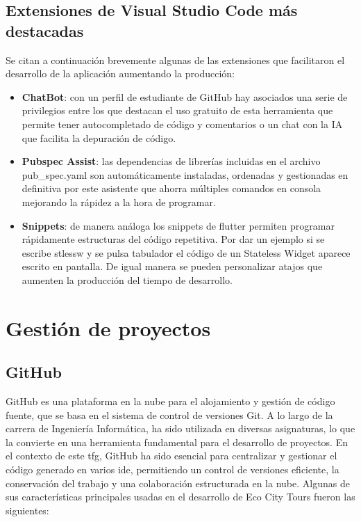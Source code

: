 	\subsection{Extensiones de Visual Studio Code más destacadas}
		Se citan a continuación brevemente algunas de las extensiones que facilitaron el desarrollo de la aplicación aumentando la producción:
		\begin{itemize}
		
		\item \textbf{ChatBot}: con un perfil de estudiante de GitHub hay asociados una serie de privilegios entre los que destacan el uso gratuito de esta herramienta que permite tener autocompletado de código y comentarios o un chat con la IA que facilita la depuración de código. 
		
		\item \textbf{Pubspec Assist}: las dependencias de librerías incluidas en el archivo pub\_spec.yaml son automáticamente instaladas, ordenadas y gestionadas en definitiva por este asistente que ahorra múltiples comandos en consola mejorando la rápidez a la hora de programar.
		
		\item \textbf{Snippets}: de manera análoga los snippets de flutter permiten programar rápidamente estructuras del código repetitiva. Por dar un ejemplo si se escribe stlessw y se pulsa tabulador el código de un Stateless Widget aparece escrito en pantalla. De igual manera se pueden personalizar atajos que aumenten la producción del tiempo de desarrollo.
		
	\end{itemize}
		

\section{Gestión de proyectos}
	\subsection{GitHub}
	GitHub es una plataforma en la nube para el alojamiento y gestión de código fuente, que se basa en el sistema de control de versiones Git. A lo largo de la carrera de Ingeniería Informática, ha sido utilizada en diversas asignaturas, lo que la convierte en una herramienta fundamental para el desarrollo de proyectos. En el contexto de este \acrshort{tfg}, GitHub ha sido esencial para centralizar y gestionar el código generado en varios \acrshort{ide}, permitiendo un control de versiones eficiente, la conservación del trabajo y una colaboración estructurada en la nube. Algunas de sus características principales usadas en el desarrollo de Eco City Tours fueron las siguientes: 
	
